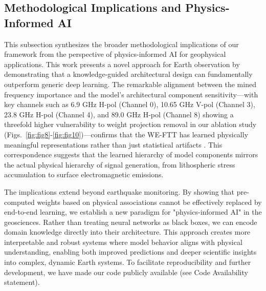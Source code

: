\documentclass[preprint,review,12pt,authoryear]{elsarticle}
\begin{document}
\subsection{Methodological Implications and Physics-Informed AI}\label{sec:discuss_implications}
This subsection synthesizes the broader methodological implications of our framework from the perspective of physics-informed AI for geophysical applications. This work presents a novel approach for Earth observation by demonstrating that a knowledge-guided architectural design can fundamentally outperform generic deep learning. The remarkable alignment between the mined frequency importance and the model's architectural component sensitivity---with key channels such as 6.9 GHz H-pol (Channel 0), 10.65 GHz V-pol (Channel 3), 23.8 GHz H-pol (Channel 4), and 89.0 GHz H-pol (Channel 8) showing a threefold higher vulnerability to weight projection removal in our ablation study (Figs.~\ref{fig:fig8}-\ref{fig:fig10})---confirms that the WE-FTT has learned physically meaningful representations rather than just statistical artifacts \citep{maoAdditionalMicrowaveRadiation2020}. This correspondence suggests that the learned hierarchy of model components mirrors the actual physical hierarchy of signal generation, from lithospheric stress accumulation to surface electromagnetic emissions.

The implications extend beyond earthquake monitoring. By showing that pre-computed weights based on physical associations cannot be effectively replaced by end-to-end learning, we establish a new paradigm for "physics-informed AI" in the geosciences. Rather than treating neural networks as black boxes, we can encode domain knowledge directly into their architecture. This approach creates more interpretable and robust systems where model behavior aligns with physical understanding, enabling both improved predictions and deeper scientific insights into complex, dynamic Earth systems. To facilitate reproducibility and further development, we have made our code publicly available (see Code Availability statement).
\end{document}
